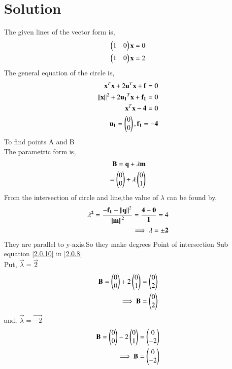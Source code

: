 \documentclass[journal,12pt,twocolumn]{IEEEtran}
\begin{document}
\section{Solution}
The given lines of the vector form is,
\begin{align}
\begin{pmatrix}1 & 0\end{pmatrix}\mathbf{x}=0
\\
\begin{pmatrix}1 & 0\end{pmatrix}\mathbf{x}=2
\end{align}
The general equation of the circle is,
\begin{align}
\mathbf{x}^T\mathbf{x} + 2\mathbf{u}^T\mathbf{x} + \mathbf{f}= 0  
\\
\left\lVert\mathbf{x}\right\rVert^2 + 2\mathbf{u_1}^T\mathbf{x} + \mathbf{f_1} = 0
\\
\mathbf{x}^T\mathbf{x}-\mathbf{4} = 0
\\
\mathbf{u_1} = \begin{pmatrix}0 \\ 0\end{pmatrix},\mathbf{f_1}=\mathbf{-4}
\end{align}
To find points A and B
\\
The parametric form is,
\begin{align}
\mathbf{B}=\mathbf{q}+\lambda \mathbf{m}\\
=\begin{pmatrix}0\\0\end{pmatrix}+\lambda \begin{pmatrix}0\\1\end{pmatrix} \label{2.0.8}
\end{align}
From the intersection of circle and line,the value of $\lambda$ can be found by,
\begin{align}
\mathbf{\lambda^2}=\frac{{\mathbf{-f_1}-\left\lVert\mathbf{q}\right\rVert^2 }}{{\left\lVert\mathbf{m}\right\rVert^2}}=\frac{{\mathbf{4}-\mathbf{0} }}{{ \mathbf{1 }}}=4
\\
\implies \mathbf{\lambda}=\pm\mathbf{2} \label{2.0.10}
\end{align}
They are parallel to y-axis.So they make  degrees
 Point of intersection
Sub equation \eqref{2.0.10} in \eqref{2.0.8}
\\
Put, $\vec{\lambda}=\vec{2}$
\begin{align}
\mathbf{B}=\begin{pmatrix}0\\0\end{pmatrix}+2\begin{pmatrix}0\\ 1\end{pmatrix}=\begin{pmatrix}0 \\ 2\end{pmatrix}
\\ 
\implies\mathbf{B}=\begin{pmatrix}0\\2\end{pmatrix}
\end{align}
and, $\vec{\lambda}=\vec{-2}$
\begin{align}
\mathbf{B}=\begin{pmatrix}0 \\0\end{pmatrix}-2\begin{pmatrix}0\\1\end{pmatrix}=\begin{pmatrix}0 \\ -2\end{pmatrix}
\\ 
\implies\mathbf{B}=\begin{pmatrix}0\\ -2\end{pmatrix}
\end{align}
\end{document}
